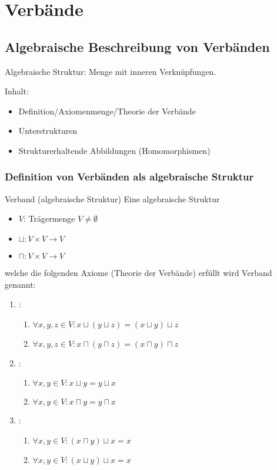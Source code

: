 \documentclass{scrartcl}
\begin{document}
\section{Verbände}

\subsection{Algebraische Beschreibung von Verbänden}

Algebraische Struktur: Menge mit inneren Verknüpfungen.

Inhalt:
\begin{itemize}
\item Definition/Axiomenmenge/Theorie der Verbände
\item Unterstrukturen
\item Strukturerhaltende Abbildungen (Homomorphismen)
\end{itemize}


\subsubsection{Definition von Verbänden als algebraische Struktur}

\begin{definition}{Verband (algebraische Struktur)}
Eine algebraische Struktur %
\begin{itemize}
\item $V$: Trägermenge $V ≠ ∅$
\item $⊔: V × V → V$
\item $⊓: V × V → V$
\end{itemize}
welche die folgenden Axiome (Theorie der Verbände) erfüllt wird Verband genannt:
\begin{enumerate}
\item {}: 
    \begin{enumerate}
    \item $∀ x, y, z ∈ V: x ⊔ (y ⊔ z) = (x ⊔ y) ⊔ z$
    \item $∀ x, y, z ∈ V: x ⊓ (y ⊓ z) = (x ⊓ y) ⊓ z$
    \end{enumerate}
\item {}:
    \begin{enumerate}
    \item $∀ x, y ∈ V: x ⊔ y = y ⊔ x$
    \item $∀ x, y ∈ V: x ⊓ y = y ⊓ x$
    \end{enumerate}
\item {}:
    \begin{enumerate}
    \item $∀ x, y ∈ V: (x ⊓ y) ⊔ x = x$ 
    \item $∀ x, y ∈ V: (x ⊔ y) ⊔ x = x$ 
    \end{enumerate}
\end{enumerate}
\end{definition}
\end{document}
